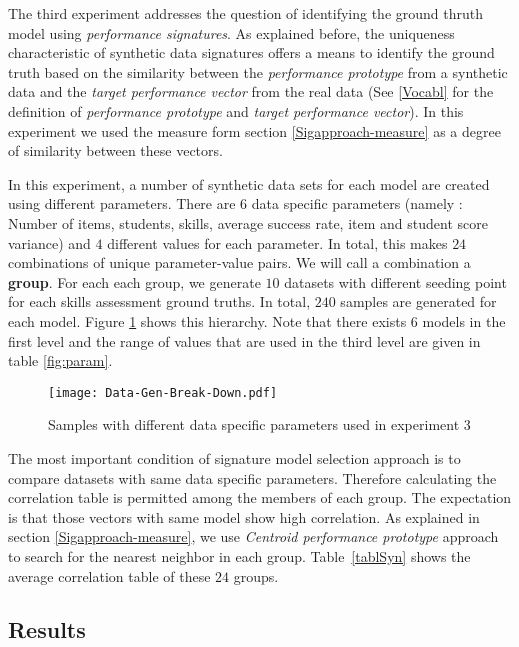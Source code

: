 The third experiment addresses the question of identifying the ground thruth model using \textit{performance signatures}. As explained before, the uniqueness characteristic of synthetic data signatures offers a means to identify the ground truth based on the similarity between the \textit{performance prototype} from a synthetic data and the \textit{target performance vector} from the real data (See \ref{Vocabl} for the definition of \textit{performance prototype} and \textit{target performance vector}). In this experiment we used the measure form section \ref{Sigapproach-measure} as a degree of similarity between these vectors.

In this experiment, a number of synthetic data sets for each model are created using different parameters. There are $6$ data specific parameters (namely : Number of items, students, skills, average success rate, item and student score variance) and $4$ different values for each parameter. In total, this makes $24$ combinations of unique parameter-value pairs. We will call a combination a \textbf{group}. For each each group, we generate $10$ datasets with different seeding point for each skills assessment ground truths. In total, $240$ samples are generated for each model. Figure \ref{figData-Gen-Break-Down} shows this hierarchy. Note that there exists 6 models in the first level and the range of values that are used in the third level are given in table \ref{fig:param}.

 \begin{figure}[h]
  \centering
    \texttt{[image: Data-Gen-Break-Down.pdf]}
\caption{Samples with different data specific parameters used in experiment 3}
\label{figData-Gen-Break-Down}
\end{figure}


The most important condition of signature model selection approach is to compare datasets with same data specific parameters. Therefore calculating the correlation table is permitted among the members of each group. The expectation is that those vectors with same model show high correlation. As explained in section \ref{Sigapproach-measure}, we use \textit{Centroid performance prototype} approach to search for the nearest neighbor in each group. Table~\ref{tablSyn} shows the average correlation table of these $24$ groups.

\subsection{Results}

